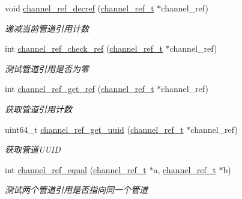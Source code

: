 \begin{DoxyCompactItemize}
void \hyperlink{a00047_a039d289fc9cc8550fece0cd7b154ca7c_a039d289fc9cc8550fece0cd7b154ca7c}{channel\+\_\+ref\+\_\+decref} (\hyperlink{a00050_a151271c9d188ef28d4d24bb81dcc1263_a151271c9d188ef28d4d24bb81dcc1263}{channel\+\_\+ref\+\_\+t} $\ast$channel\+\_\+ref)
\begin{DoxyCompactList}\small\item\em 递减当前管道引用计数 \end{DoxyCompactList}\item 
int \hyperlink{a00047_a57f990b42c6d0e5f12cb8e59c18bdcf3_a57f990b42c6d0e5f12cb8e59c18bdcf3}{channel\+\_\+ref\+\_\+check\+\_\+ref} (\hyperlink{a00050_a151271c9d188ef28d4d24bb81dcc1263_a151271c9d188ef28d4d24bb81dcc1263}{channel\+\_\+ref\+\_\+t} $\ast$channel\+\_\+ref)
\begin{DoxyCompactList}\small\item\em 测试管道引用是否为零 \end{DoxyCompactList}\item 
int \hyperlink{a00047_a69e281781c5375b06a0fc8c2fdc5ea19_a69e281781c5375b06a0fc8c2fdc5ea19}{channel\+\_\+ref\+\_\+get\+\_\+ref} (\hyperlink{a00050_a151271c9d188ef28d4d24bb81dcc1263_a151271c9d188ef28d4d24bb81dcc1263}{channel\+\_\+ref\+\_\+t} $\ast$channel\+\_\+ref)
\begin{DoxyCompactList}\small\item\em 获取管道引用计数 \end{DoxyCompactList}\item 
uint64\+\_\+t \hyperlink{a00101_ga3fd39b821fef38abd518db6240e79068_ga3fd39b821fef38abd518db6240e79068}{channel\+\_\+ref\+\_\+get\+\_\+uuid} (\hyperlink{a00050_a151271c9d188ef28d4d24bb81dcc1263_a151271c9d188ef28d4d24bb81dcc1263}{channel\+\_\+ref\+\_\+t} $\ast$channel\+\_\+ref)
\begin{DoxyCompactList}\small\item\em 获取管道\+U\+U\+I\+D \end{DoxyCompactList}\item 
int \hyperlink{a00101_gad44fcb68845cb3ebb582a9de6db9abd0_gad44fcb68845cb3ebb582a9de6db9abd0}{channel\+\_\+ref\+\_\+equal} (\hyperlink{a00050_a151271c9d188ef28d4d24bb81dcc1263_a151271c9d188ef28d4d24bb81dcc1263}{channel\+\_\+ref\+\_\+t} $\ast$a, \hyperlink{a00050_a151271c9d188ef28d4d24bb81dcc1263_a151271c9d188ef28d4d24bb81dcc1263}{channel\+\_\+ref\+\_\+t} $\ast$b)
\begin{DoxyCompactList}\small\item\em 测试两个管道引用是否指向同一个管道 \end{DoxyCompactList}\item 

\end{DoxyCompactItemize}
